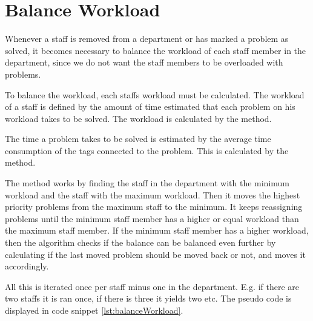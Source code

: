 \section{Balance Workload}
Whenever a staff is removed from a department or has marked a problem as solved, 
it becomes necessary to balance the workload of each staff member in the department, since we do not want the staff members to be overloaded with problems. 

To balance the workload, each staffs workload must be calculated. 
The workload of a staff is defined by the amount of time estimated that each problem on his workload takes to be solved. 
The workload is calculated by the  method.

The time a problem takes to be solved is estimated by the average time consumption of the tags connected to the problem. 
This is calculated by the  method.

The  method works by finding the staff in the department with the minimum workload and the staff with the maximum workload. Then it moves the highest priority problems from the maximum staff to the minimum. 
It keeps reassigning problems until the minimum staff member has a higher or equal workload than the maximum staff member. If the minimum staff member has a higher workload, then the algorithm checks if the balance can be balanced even further by calculating if the last moved problem should be moved back or not, and moves it accordingly.



All this is iterated once per staff minus one in the department. 
E.g. if there are two staffs it is ran once, if there is three it yields two etc. 
The pseudo code is displayed in code snippet \ref{lst:balanceWorkload}.

